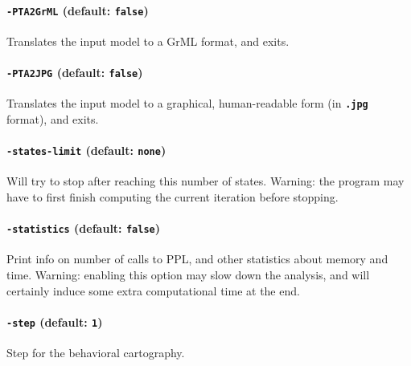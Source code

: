 \documentclass[a4paper,11pt]{article}
\newcommand{\code}[1]{\textbf{\texttt{#1}}}
\begin{document}
\paragraph{\code{-PTA2GrML} (default: \code{false})}
Translates the input model to a GrML format, and exits.


\paragraph{\code{-PTA2JPG} (default: \code{false})}
Translates the input model to a graphical, human-readable form (in \code{.jpg} format), and exits.


\paragraph{\code{-states-limit} (default: \code{none})}
Will try to stop after reaching this number of states.
Warning: the program may have to first finish computing the current iteration before stopping.


\paragraph{\code{-statistics} (default: \code{false})}
Print info on number of calls to PPL, and other statistics about memory and time.
Warning: enabling this option may slow down the analysis, and will certainly induce some extra computational time at the end.


\paragraph{\code{-step} (default: \code{1})}
Step for the behavioral cartography.


\end{document}
